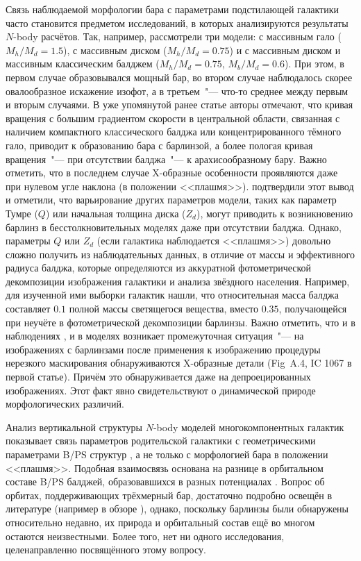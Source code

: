 \documentclass{trlnotes}
\begin{document}
Связь наблюдаемой морфологии бара с параметрами подстилающей галактики часто становится предметом исследований, в которых анализируются
результаты $N$-body расчётов. Так, например, \citet{athanassoula2002} рассмотрели три модели: с массивным гало ($M_h/M_d = 1.5$), с массивным
диском ($M_h/M_d = 0.75$) и с массивным диском и массивным классическим балджем ($M_h/M_d = 0.75$, $M_b/M_d = 0.6$). При этом, в первом случае
образовывался мощный  бар, во втором случае наблюдалось скорее овалообразное искажение изофот, а в третьем~"--- что-то среднее между первым и
вторым случаями. В уже упомянутой ранее статье \citet{salo2017} авторы отмечают, что кривая вращения с большим градиентом скорости в центральной
области, связанная с наличием компактного классического балджа или концентрированного тёмного гало, приводит к образованию бара с барлинзой, а
более пологая кривая вращения~"--- при отсутствии балджа~"--- к арахисообразному бару. Важно отметить, что в последнем случае X-образные
особенности проявляются даже при нулевом угле наклона (в положении <<плашмя>>).  \citet{smirnov2018} подтвердили этот вывод и отметили, что
варьирование других параметров модели, таких как параметр Тумре ($Q$) или начальная толщина диска ($Z_d$), могут приводить к возникновению
барлинз в бесстолкновительных моделях даже при отсутствии балджа. Однако, параметры $Q$ или $Z_d$ (если галактика наблюдается <<плашмя>>)
довольно сложно получить из наблюдательных данных, в отличие от массы и эффективного радиуса балджа, которые определяются из аккуратной
фотометрической декомпозиции изображения галактики и анализа звёздного населения. Например, \citet{laurikainen2014} для изученной ими выборки
галактик нашли, что относительная масса балджа составляет $0.1$ полной массы светящегося вещества, вместо $0.35$, получающейся при неучёте в
фотометрической декомпозиции барлинзы. Важно отметить, что и в наблюдениях \citep{laurikainen2017}, и в моделях \citep{salo2017} возникает
промежуточная ситуация~"--- на изображениях с барлинзами после применения к изображению процедуры нерезкого маскирования обнаруживаются
X-образные детали (Fig~A.4, IC 1067 в первой статье). Причём это обнаруживается даже на депроецированных изображениях. Этот факт явно
свидетельствуют о динамической природе морфологических различий. 

Анализ вертикальной структуры $N$-body моделей многокомпонентных галактик показывает связь параметров родительской
галактики с геометрическими параметрами B/PS структур \citep{smirnov2018}, а не только с морфологией бара
в положении <<плашмя>>. Подобная взаимосвязь основана на разнице в орбитальном составе B/PS балджей, образовавшихся в разных
потенциалах \citep{parul2020}. Вопрос об орбитах, поддерживающих трёхмерный бар, достаточно подробно освещён в
литературе (например в обзоре \cite{athanassoula2016}), однако, поскольку барлинзы были обнаружены относительно
недавно, их природа и орбитальный состав ещё во многом остаются
неизвестными. Более того, нет ни одного исследования, целенаправленно посвящённого этому вопросу.
\end{document}
